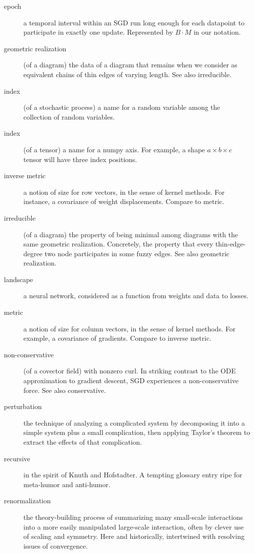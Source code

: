 \documentclass{article}
\begin{document}
\begin{description}
        \item[epoch] a temporal interval within an SGD run long enough for each datapoint to participate in exactly one update.  Represented by $B\cdot M$ in our notation.
        \item[geometric realization] (of a diagram) the data of a diagram that remains when we consider as equivalent chains of thin edges of varying length.  See also irreducible.
        \item[index] (of a stochastic process) a name for a random variable among the collection of random variables.
        \item[index] (of a tensor) a name for a numpy axis.  For example, a shape $a\times b\times c$ tensor will have three index positions. 
        \item[inverse metric] a notion of size for row vectors, in the sense of kernel methods.  For instance, a covariance of weight displacements.  Compare to metric.
        \item[irreducible] (of a diagram) the property of being minimal among diagrams with the same geometric realization.  Concretely, the property that every thin-edge-degree two node participates in some fuzzy edges.  See also geometric realization. 
        \item[landscape] a neural network, considered as a function from weights and data to losses. 
        \item[metric] a notion of size for column vectors, in the sense of kernel methods.  For example, a covariance of gradients.  Compare to inverse metric.
        \item[non-conservative] (of a covector field) with nonzero curl.  In striking contrast to the ODE approximation to gradient descent, SGD experiences a non-conservative force.  See also conservative.
        \item[perturbation] the technique of analyzing a complicated system by decomposing it into a simple system plus a small complication, then applying Taylor's theorem to extract the effects of that complication.  
        \item[recursive] in the spirit of Knuth and Hofstadter.  A tempting glossary entry ripe for meta-humor and anti-humor. 
        \item[renormalization] the theory-building process of summarizing many small-scale interactions into a more easily manipulated large-scale interaction, often by clever use of scaling and symmetry.  Here and historically, intertwined with resolving issues of convergence.  

\end{description}
\end{document}
